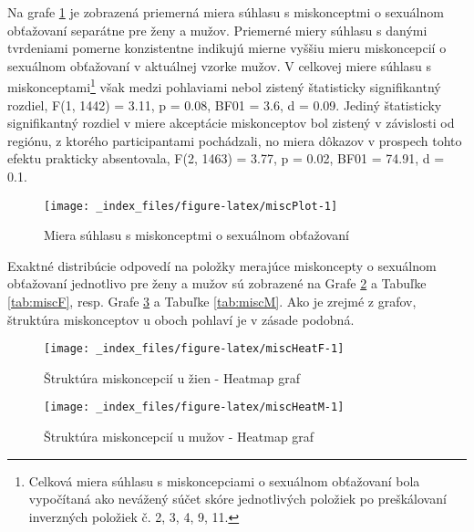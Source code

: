 \documentclass[
]{article}
\begin{document}
Na grafe \ref{fig:miscPlot} je zobrazená priemerná miera súhlasu s miskonceptmi o sexuálnom obťažovaní separátne pre ženy a mužov. Priemerné miery súhlasu s danými tvrdeniami pomerne konzistentne indikujú mierne vyššiu mieru miskoncepcií o sexuálnom obťažovaní v aktuálnej vzorke mužov. V celkovej miere súhlasu s miskonceptami\footnote{Celková miera súhlasu s miskoncepciami o sexuálnom obťažovaní bola vypočítaná ako nevážený súčet skóre jednotlivých položiek po preškálovaní inverzných položiek č. 2, 3, 4, 9, 11.} však medzi pohlaviami nebol zistený štatisticky signifikantný rozdiel, F(1, 1442) = 3.11, p = 0.08, BF01 = 3.6, d = 0.09. Jediný štatisticky signifikantný rozdiel v miere akceptácie miskonceptov bol zistený v závislosti od regiónu, z ktorého participantami pochádzali, no miera dôkazov v prospech tohto efektu prakticky absentovala, F(2, 1463) = 3.77, p = 0.02, BF01 = 74.91, d = 0.1.

\begin{figure}

{\centering \texttt{[image: \_index\_files/figure-latex/miscPlot-1]} 

}

\caption{Miera súhlasu s miskonceptmi o sexuálnom obťažovaní}\label{fig:miscPlot}
\end{figure}

Exaktné distribúcie odpovedí na položky merajúce miskoncepty o sexuálnom obťažovaní jednotlivo pre ženy a mužov sú zobrazené na Grafe \ref{fig:miscHeatF} a Tabuľke \ref{tab:miscF}, resp. Grafe \ref{fig:miscHeatM} a Tabuľke \ref{tab:miscM}. Ako je zrejmé z grafov, štruktúra miskonceptov u oboch pohlaví je v zásade podobná.

\begin{figure}

{\centering \texttt{[image: \_index\_files/figure-latex/miscHeatF-1]} 

}

\caption{Štruktúra miskoncepcií u žien - Heatmap graf}\label{fig:miscHeatF}
\end{figure}

\begin{figure}

{\centering \texttt{[image: \_index\_files/figure-latex/miscHeatM-1]} 

}

\caption{Štruktúra miskoncepcií u mužov - Heatmap graf}\label{fig:miscHeatM}
\end{figure}
\end{document}
